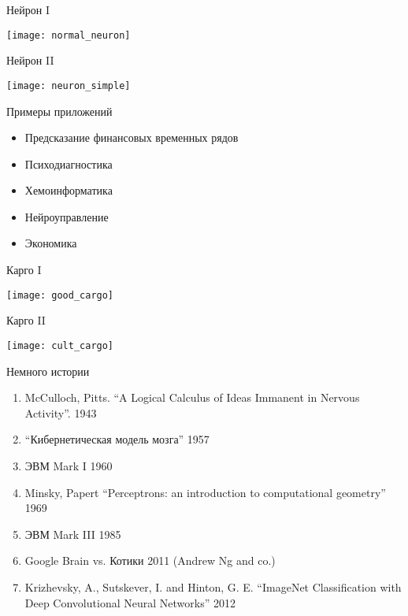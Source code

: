 \documentclass[14pt, fleqn, xcolor={dvipsnames, table}]{beamer}
\begin{document}
\begin{frame}{Нейрон I}
\begin{center}
\texttt{[image: normal\_neuron]}
\end{center}
\end{frame}

\begin{frame}{Нейрон II}
\begin{center}
\texttt{[image: neuron\_simple]}
\end{center}
\end{frame}

\begin{frame}{Примеры приложений}
\begin{itemize}
  \item Предсказание финансовых временных рядов
  \item Психодиагностика
  \item Хемоинформатика
  \item Нейроуправление
  \item Экономика
\end{itemize}
\end{frame}

\begin{frame}{Карго I}
\begin{center}
\texttt{[image: good\_cargo]}
\end{center}
\end{frame}


\begin{frame}{Карго II}
\begin{center}
\texttt{[image: cult\_cargo]}
\end{center}
\end{frame}



\begin{frame}{Немного истории}
\begin{enumerate}
  \item McCulloch, Pitts. ``A Logical Calculus of Ideas Immanent in Nervous Activity''. 1943
  \item ``Кибернетическая модель мозга'' 1957
  \item ЭВМ Mark I 1960
  \item Minsky, Papert ``Perceptrons: an introduction to computational geometry'' 1969
  \item ЭВМ Mark III 1985
  \item Google Brain vs. Котики 2011 (Andrew Ng and co.)
  \item Krizhevsky, A., Sutskever, I. and Hinton, G. E. ``ImageNet Classification with Deep Convolutional Neural Networks'' 2012
\end{enumerate}

\end{frame}
\end{document}
